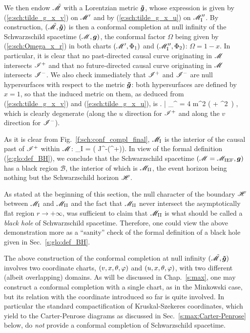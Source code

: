We then endow $\tilde{\mathscr{M}}$ with a Lorentzian metric $\bm{\tilde{g}}$, whose
expression is given by (\ref{e:sch:tilde_g_x_v}) on $\mathscr{M}'$ and
by (\ref{e:sch:tilde_g_x_u}) on $\mathscr{M}''_{\rm I}$.
By construction, $(\tilde{\mathscr{M}},\bm{\tilde{g}})$ is then a conformal completion at null
infinity of the Schwarzschild spacetime $(\mathscr{M},\bm{g})$, the conformal factor
$\Omega$ being given by (\ref{e:sch:Omega_x_r}) in both
charts $(\mathscr{M}',\Phi_1)$ and $(\mathscr{M}''_{\rm I},\Phi_2)$: $\Omega = 1 -x$.
In particular, it is clear that no past-directed causal curve originating in
$\mathscr{M}$ intersects $\mathscr{I}^+$ and that no future-directed causal curve originating in
$\mathscr{M}$ intersects $\mathscr{I}^-$. We also check immediately that $\mathscr{I}^+$ and $\mathscr{I}^-$
are null hypersurfaces with respect to the metric $\bm{\tilde{g}}$:
both hypersurfaces are defined by $x=1$, so that the induced metric on them,
as
deduced from (\ref{e:sch:tilde_g_x_v}) and
(\ref{e:sch:tilde_g_x_u}), is
\be
    \left.  \right| _{\scri^\pm} = 4 m^2 \left(
        \dd \th\otimes \dd \th + \sin^2\th \, \dd \ph \otimes \dd \ph \right) ,
\ee
which is clearly degenerate (along the $u$ direction for $\mathscr{I}^+$
and along the $v$ direction for $\mathscr{I}^-$).

As it is clear from Fig.~\ref{f:sch:conf_compl_final}, $\mathscr{M}_{\rm I}$
is the interior of the causal past of $\mathscr{I}^+$ within $\mathscr{M}$:
\be
    \M_{\rm I} = \left( J^-(\scri^+)\cap\M \right).
\ee
In view of the formal definition (\ref{e:glo:def_BH}), we conclude that
the Schwarzschild spacetime $(\mathscr{M}=\mathscr{M}_{\rm IEF}, \bm{g})$
has a black region $\mathscr{B}$, the interior
of which is $\mathscr{M}_{\rm II}$, the event horizon being nothing but the
Schwarzschild horizon $\mathscr{H}$.

\begin{remark}
As stated at the beginning of this section, the null character of the boundary
$\mathscr{H}$ between $\mathscr{M}_{\rm I}$ and $\mathscr{M}_{\rm II}$ and the fact that
$\mathscr{M}_{\rm II}$ never intersect the asymptotically flat region $r\rightarrow +\infty$,
was sufficient to claim that $\mathscr{M}_{\rm II}$ is what should be
called a \emph{black hole}  of Schwarzschild spacetime.
Therefore, one could view the above demonstration more as a ``sanity'' check
of the formal definition of a black hole given in Sec.~\ref{s:glo:def_BH}.
\end{remark}

\begin{remark}
The above construction of the conformal completion at null infinity
$(\tilde{\mathscr{M}},\bm{\tilde{g}})$ involves two coordinate charts,
$(v,x,\theta,\varphi)$ and $(u,x,\theta,\varphi)$, with two different (albeit overlapping)
domains.
As will be discussed in Chap.~\ref{s:max},
one may construct a conformal completion
with a single chart, as in the Minkowski case, but its relation with
the coordinate introduced so far is quite involved.
In particular the standard compactification of Kruskal-Szekeres coordinates,
which yield to the Carter-Penrose diagrams as discussed in Sec.~\ref{s:max:Carter-Penrose} below, do \emph{not} provide a
conformal completion of Schwarzschild spacetime.
\end{remark}



